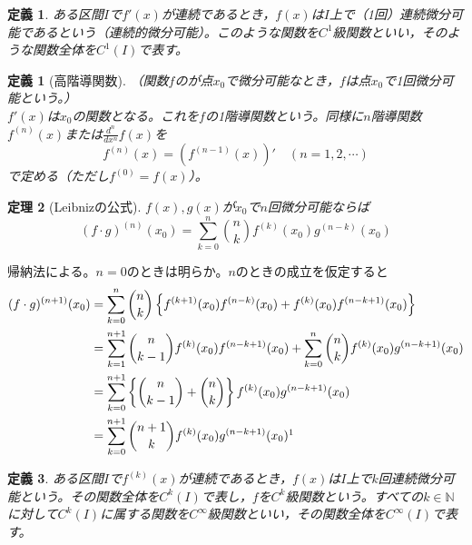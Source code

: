 \documentclass[dvipdfmx,a4j,10pt]{jsarticle}
\makeatletter
\theoremstyle{mystyle1}
\newtheorem{dfn}{定義}[part]
\newtheorem{thm}[dfn]{定理}
\theoremstyle{mystyle2}
\newtheorem{dfn*}{定義}
\renewenvironment{proof}[1][\proofname]{\par
  \pushQED{\qed}%
  \normalfont
  \topsep6\p@\@plus6\p@ \trivlist
  \item[\hskip\labelsep{\bfseries\sffamily #1}]\ignorespaces
}{%
  \popQED\endtrivlist\@endpefalse
}
\renewcommand\proofname{証明}
\makeatother
\begin{document}
\begin{framed}
\begin{dfn}\label{def7.5}
ある区間$I$で$f'(x)$が連続であるとき，$f(x)$は$I$上で（1回）連続微分可能であるという（連続的微分可能）。このような関数を$C^1$級関数といい，そのような関数全体を$C^1(I)$で表す。
\end{dfn}
\end{framed}
\begin{dfn*}[高階導関数]（関数$f$のが点$x_0$で微分可能なとき，$f$は点$x_0$で1回微分可能という。）\\
    $f'(x)$は$x_0$の関数となる。これを$f$の1階導関数という。同様に$n$階導関数$f^{(n)}(x)$または$\displaystyle \frac{d^n}{dx^n}f(x)$を
    \[
    f^{(n)}(x)=(f^{(n-1)}(x))'\quad(n=1,2,\cdots)
    \]
    で定める（ただし$f^{(0)}=f(x)$）。
\end{dfn*}

\begin{framed}
    \begin{thm}[Leibnizの公式]\label{thm7.6}
        $f(x),g(x)$が$x_0$で$n$回微分可能ならば
        \[
        (f\cdot g)^{(n)}(x_0)=\sum_{k=0}^{n}\binom{n}{k}f^{(k)}(x_0)g^{(n-k)}(x_0)
        \]
    \end{thm}
\end{framed}

\begin{proof}[定理\ref{thm7.6}の証明]
    帰納法による。$n=0$のときは明らか。$n$のときの成立を仮定すると
    \[
    \begin{split}
    (f\cdot g)^{(n+1)}(x_0)
    &=\sum_{k=0}^{n}\binom{n}{k}\left\{f^{(k+1)}(x_0)f^{(n-k)}(x_0)+f^{(k)}(x_0)f^{(n-k+1)}(x_0)\right\}\\
    &=\sum_{k=1}^{n+1}\binom{n}{k-1}f^{(k)}(x_0)f^{(n-k+1)}(x_0)+\sum_{k=0}^{n}\binom{n}{k}f^{(k)}(x_0)g^{(n-k+1)}(x_0)\\
    &=\sum_{k=0}^{n+1}\left\{\binom{n}{k-1}+\binom{n}{k}\right\}f^{(k)}(x_0)g^{(n-k+1)}(x_0)\\
    &=\sum_{k=0}^{n+1}\binom{n+1}{k}f^{(k)}(x_0)g^{(n-k+1)}(x_0)
    \footnotemark
    \end{split}
    \]
\end{proof}

\begin{framed}
    \begin{dfn}
        ある区間$I$で$f^{(k)}(x)$が連続であるとき，$f(x)$は$I$上で$k$回連続微分可能という。その関数全体を$C^k(I)$で表し，$f$を$C^k$級関数という。すべての$k\in\mathbb{N}$に対して$C^k(I)$に属する関数を$C^\infty$級関数といい，その関数全体を$C^\infty(I)$で表す。\footnotemark
    \end{dfn}
\end{framed}
\end{document}
